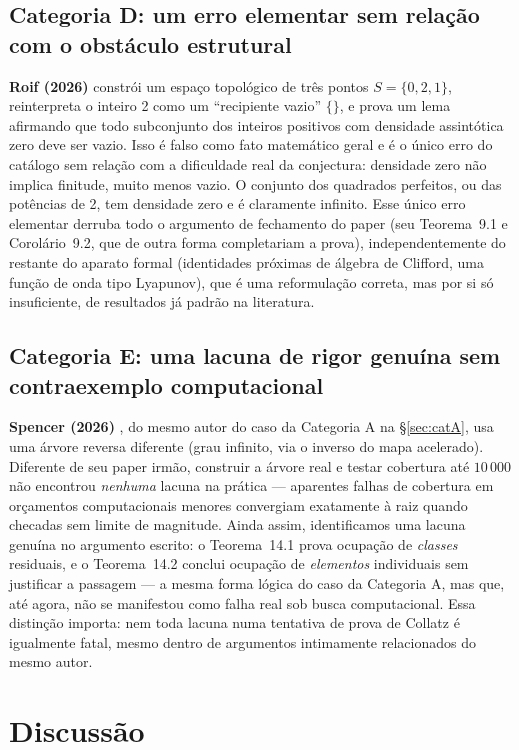\documentclass[11pt]{article}
\begin{document}
\subsection{Categoria D: um erro elementar sem relação com o obstáculo estrutural}
\label{sec:catD}

\textbf{Roif (2026)} \cite{Roif2026} constrói um espaço topológico de
três pontos $S=\{0,2,1\}$, reinterpreta o inteiro 2 como um
``recipiente vazio'' $\{\}$, e prova um lema afirmando que todo
subconjunto dos inteiros positivos com densidade assintótica zero deve
ser vazio. Isso é falso como fato matemático geral e é o único erro do
catálogo sem relação com a dificuldade real da conjectura: densidade
zero não implica finitude, muito menos vazio. O conjunto dos quadrados
perfeitos, ou das potências de 2, tem densidade zero e é claramente
infinito. Esse único erro elementar derruba todo o argumento de
fechamento do paper (seu Teorema~9.1 e Corolário~9.2, que de outra
forma completariam a prova), independentemente do restante do aparato
formal (identidades próximas de álgebra de Clifford, uma função de onda
tipo Lyapunov), que é uma reformulação correta, mas por si só
insuficiente, de resultados já padrão na literatura.

\subsection{Categoria E: uma lacuna de rigor genuína sem contraexemplo computacional}
\label{sec:catE}

\textbf{Spencer (2026)} \cite{Spencer2025b}, do mesmo autor do caso da
Categoria A na \S\ref{sec:catA}, usa uma árvore reversa diferente (grau
infinito, via o inverso do mapa acelerado). Diferente de seu paper
irmão, construir a árvore real e testar cobertura até $10\,000$ não
encontrou \emph{nenhuma} lacuna na prática --- aparentes falhas de
cobertura em orçamentos computacionais menores convergiam exatamente à
raiz quando checadas sem limite de magnitude. Ainda assim, identificamos
uma lacuna genuína no argumento escrito: o Teorema~14.1 prova ocupação
de \emph{classes} residuais, e o Teorema~14.2 conclui ocupação de
\emph{elementos} individuais sem justificar a passagem --- a mesma forma
lógica do caso da Categoria A, mas que, até agora, não se manifestou
como falha real sob busca computacional. Essa distinção importa: nem
toda lacuna numa tentativa de prova de Collatz é igualmente fatal, mesmo
dentro de argumentos intimamente relacionados do mesmo autor.

\section{Discussão}
\label{sec:discussion}
\end{document}
